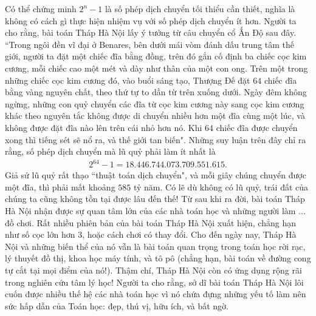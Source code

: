 	\vskip 0.1cm
	Có thể chứng minh $2^n - 1$  là số phép dịch chuyển tối thiểu cần thiết, nghĩa là không có cách gì thực hiện nhiệm vụ với số phép dịch chuyển ít hơn.
	\vskip 0.1cm
	Người ta cho rằng, bài toán Tháp Hà Nội lấy ý tưởng từ câu chuyển cổ Ấn Độ sau đây.
	\vskip 0.1cm
	``Trong ngôi đền vĩ đại ở Benares, bên dưới mái vòm đánh dấu trung tâm thế giới, người ta đặt một chiếc đĩa bằng đồng, trên đó gắn cố định ba chiếc cọc kim cương, mỗi chiếc cao một mét và dày như thân của một con ong. Trên một trong những chiếc cọc  kim cương đó, vào buổi sáng tạo, Thượng Đế đặt $64$ chiếc đĩa bằng vàng nguyên chất, theo thứ tự to dần từ trên xuống dưới.  Ngày đêm không ngừng, những con quỷ chuyển các đĩa từ cọc kim cương này sang cọc kim cương khác theo nguyên tắc không được di chuyển nhiều hơn một đĩa cùng một lúc, và không được đặt đĩa nào lên trên cái nhỏ hơn nó. Khi $64$ chiếc  đĩa  được chuyển xong thì tiếng sét sẽ nổ ra, và thế giới tan biến".
	\vskip 0.1cm
	Những suy luận trên đây chỉ ra rằng, số phép dịch chuyển mà lũ quỷ phải làm ít nhất là
	\begin{align*}
		2^{64} - 1= 18{.}446{.}744{.}073{.}709{.}551{.}615.
	\end{align*}
	Giả sử lũ quỷ rất thạo ``thuật toán dịch chuyển", và mỗi giây chúng chuyển được một đĩa, thì phải mất khoảng $585$ tỷ năm. Có lẽ dù không có lũ quỷ, trái đất của chúng ta cũng không tồn tại được lâu đến thế!
	\vskip 0.1cm
	Từ sau khi ra đời, bài toán Tháp Hà Nội nhận được sự quan tâm lớn của các nhà toán học và những người làm ... đồ chơi. Rất nhiều phiên bản của bài toán Tháp Hà Nội xuất hiện, chẳng hạn như số cọc lớn hơn $3$, hoặc cách chơi có thay đổi. Cho đến ngày nay, Tháp Hà Nội và những biến thể của nó vẫn là bài toán quan trọng trong toán học rời rạc, lý thuyết đồ thị, khoa học máy tính, và tô pô (chẳng hạn, bài toán về đường cong tự cắt tại mọi điểm của nó!). Thậm chí, Tháp Hà Nội còn có ứng dụng rộng rãi trong nghiên cứu tâm lý học!
	\vskip 0.1cm
	Người ta cho rằng, sở dĩ bài toán Tháp Hà Nội lôi cuốn được nhiều thế hệ các nhà toán học vì nó chứa đựng những yếu tố làm nên sức hấp dẫn của Toán học: đẹp, thú vị, hữu ích, và bất ngờ.
	\newpage
	\begingroup
